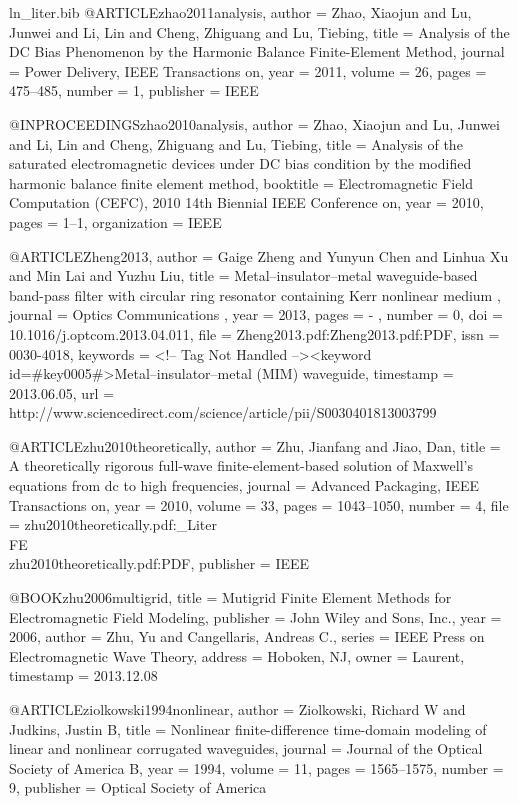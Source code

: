 \begin{filecontents*}{ln_liter.bib}
@ARTICLE{zhao2011analysis,
  author = {Zhao, Xiaojun and Lu, Junwei and Li, Lin and Cheng, Zhiguang and
	Lu, Tiebing},
  title = {Analysis of the {DC} Bias Phenomenon by the Harmonic Balance Finite-Element
	Method},
  journal = {Power Delivery, IEEE Transactions on},
  year = {2011},
  volume = {26},
  pages = {475--485},
  number = {1},
  publisher = {IEEE}
}

@INPROCEEDINGS{zhao2010analysis,
  author = {Zhao, Xiaojun and Lu, Junwei and Li, Lin and Cheng, Zhiguang and
	Lu, Tiebing},
  title = {Analysis of the saturated electromagnetic devices under {DC} bias
	condition by the modified harmonic balance finite element method},
  booktitle = {Electromagnetic Field Computation (CEFC), 2010 14th Biennial IEEE
	Conference on},
  year = {2010},
  pages = {1--1},
  organization = {IEEE}
}

@ARTICLE{Zheng2013,
  author = {Gaige Zheng and Yunyun Chen and Linhua Xu and Min Lai and Yuzhu Liu},
  title = {Metal–insulator–metal waveguide-based band-pass filter with circular
	ring resonator containing Kerr nonlinear medium },
  journal = {Optics Communications },
  year = {2013},
  pages = { - },
  number = {0},
  doi = {10.1016/j.optcom.2013.04.011},
  file = {Zheng2013.pdf:Zheng2013.pdf:PDF},
  issn = {0030-4018},
  keywords = {<!-- Tag Not Handled --><keyword id=#key0005#>Metal–insulator–metal
	(MIM) waveguide},
  timestamp = {2013.06.05},
  url = {http://www.sciencedirect.com/science/article/pii/S0030401813003799}
}

@ARTICLE{zhu2010theoretically,
  author = {Zhu, Jianfang and Jiao, Dan},
  title = {A theoretically rigorous full-wave finite-element-based solution
	of {M}axwell's equations from dc to high frequencies},
  journal = {Advanced Packaging, IEEE Transactions on},
  year = {2010},
  volume = {33},
  pages = {1043--1050},
  number = {4},
  file = {zhu2010theoretically.pdf:_Liter\\FE\\zhu2010theoretically.pdf:PDF},
  publisher = {IEEE}
}

@BOOK{zhu2006multigrid,
  title = {Mutigrid Finite Element Methods for Electromagnetic Field Modeling},
  publisher = {John Wiley and Sons, Inc.},
  year = {2006},
  author = {Zhu, Yu and Cangellaris, Andreas C.},
  series = {IEEE Press on Electromagnetic Wave Theory},
  address = {Hoboken, NJ},
  owner = {Laurent},
  timestamp = {2013.12.08}
}

@ARTICLE{ziolkowski1994nonlinear,
  author = {Ziolkowski, Richard W and Judkins, Justin B},
  title = {Nonlinear finite-difference time-domain modeling of linear and nonlinear
	corrugated waveguides},
  journal = {Journal of the Optical Society of America B},
  year = {1994},
  volume = {11},
  pages = {1565--1575},
  number = {9},
  publisher = {Optical Society of America}
}


\end{filecontents*}
